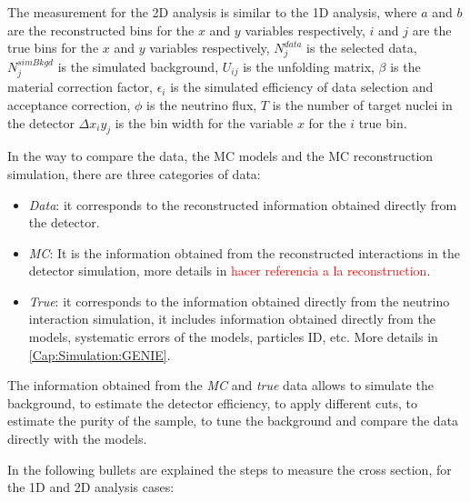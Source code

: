 The measurement for the 2D analysis is similar to the 1D analysis, where $a$ and $b$ are the reconstructed bins for the $x$ and $y$ variables respectively, $i$ and $j$ are the true bins for the $x$ and $y$ variables respectively, $N_j^{data}$ is the selected data, $N_j^{sim Bkgd}$ is the simulated background, $U_{ij}$ is the unfolding matrix, $\beta$ is the material correction factor, $\epsilon_i$ is the simulated efficiency of data selection and acceptance correction, $\phi$ is the neutrino flux, $T$ is the number of target nuclei in the detector $\Delta x_i y_j$ is the bin width for the variable $x$ for the $i$ true bin.

In the way to compare the data, the MC models and the MC reconstruction simulation, there are three categories of data:
\begin{itemize}
    \item \textit{Data}: it corresponds to the reconstructed information obtained directly from the detector.
    \item \textit{MC}: It is the information obtained from the reconstructed interactions in the detector simulation, more details in \textcolor{red}{hacer referencia a la reconstruction}. 
    \item \textit{True}: it corresponds to the information obtained directly from the neutrino interaction simulation, it includes information obtained directly from the models, systematic errors of the models, particles ID, etc. More details in \ref{Cap:Simulation:GENIE}.
\end{itemize}

The information obtained from the \textit{MC} and \textit{true} data allows to simulate the background, to estimate the detector efficiency, to apply different cuts, to estimate the purity of the sample, to tune the background and compare the data directly with the models. 

In the following bullets are explained the steps to measure the cross section, for the 1D and 2D analysis cases:

